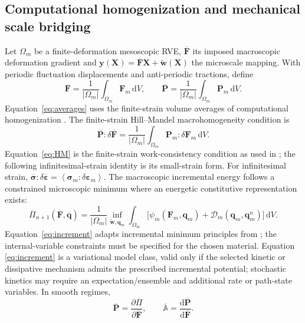\documentclass[11pt,a4paper]{article}
\newcommand{\dd}{\mathrm{d}}\newcommand{\avg}[1]{\left\langle #1\right\rangle}\newcommand{\Grad}{\operatorname{Grad}}
\begin{document}
\subsection{Computational homogenization and mechanical scale bridging}
Let $\Omega_m$ be a finite-deformation mesoscopic RVE, $\overline{\mathbf F}$ its imposed macroscopic deformation gradient and $\mathbf y(\mathbf X)=\overline{\mathbf F}\mathbf X+\widetilde{\mathbf w}(\mathbf X)$ the microscale mapping. With periodic fluctuation displacements and anti-periodic tractions, define
\begin{equation}
 \overline{\mathbf F}=\frac{1}{|\Omega_m|}\int_{\Omega_m}\mathbf F_m\,\dd V,
 \qquad
 \overline{\mathbf P}=\frac{1}{|\Omega_m|}\int_{\Omega_m}\mathbf P_m\,\dd V.\label{eq:averages}
\end{equation}
Equation~\eqref{eq:averages} uses the finite-strain volume averages of computational homogenization \cite{miehe1999,miehe2002a}.
The finite-strain Hill--Mandel macrohomogeneity condition is
\begin{equation}
 \overline{\mathbf P}:\delta\overline{\mathbf F}
 =\frac{1}{|\Omega_m|}\int_{\Omega_m}\mathbf P_m:\delta\mathbf F_m\,\dd V.\label{eq:HM}
\end{equation}
Equation~\eqref{eq:HM} is the finite-strain work-consistency condition as used in \cite{miehe1999,miehe2002a}; the following infinitesimal-strain identity is its small-strain form.
For infinitesimal strain, $\overline{\bm\sigma}:\delta\overline{\bm\varepsilon}
=\avg{\bm\sigma_m:\delta\bm\varepsilon_m}$. The macroscopic incremental energy follows a constrained microscopic minimum where an energetic constitutive representation exists:
\begin{equation}
 \overline\Pi_{n+1}(\overline{\mathbf F},\overline{\mathbf q})
 =\frac{1}{|\Omega_m|}\inf_{\widetilde{\mathbf w},\mathbf q_m}
 \int_{\Omega_m}\!\big[\psi_m(\mathbf F_m,\mathbf q_m)+
 \mathcal D_m(\mathbf q_m,\mathbf q_m^{n})\big]\,\dd V.\label{eq:increment}
\end{equation}
Equation~\eqref{eq:increment} adapts incremental minimum principles from \cite{miehe2002a,miehe2002b}; the internal-variable constraints must be specified for the chosen material.
Equation \eqref{eq:increment} is a variational model class, valid only if the selected kinetic or dissipative mechanism admits the prescribed incremental potential; stochastic kinetics may require an expectation/ensemble and additional rate or path-state variables. In smooth regimes,
\begin{equation}
 \overline{\mathbf P}=\frac{\partial\overline\Pi}{\partial\overline{\mathbf F}},\qquad
 \overline{\mathbb A}=\frac{\dd\overline{\mathbf P}}{\dd\overline{\mathbf F}}.
 \label{eq:tangent}
\end{equation}
\end{document}
